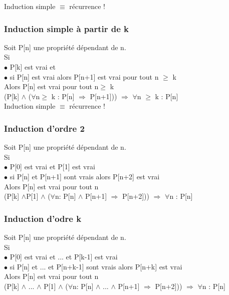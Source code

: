Induction simple $\equiv$ récurrence !
\subsubsection{Induction simple à partir de k}
Soit P[n] une propriété dépendant de n.\\
Si\\ $\bullet$ P[k] est vrai et \\ $\bullet$ si P[n] est vrai alors P[n+1] est vrai pour tout n $\geq$ k \\ Alors P[n] est vrai pour tout n$\geq$ k\\

(P[k] $\wedge$ ($\forall$n$\geq$ k : P[n] $\Rightarrow$ P[n+1])) $\Rightarrow$ $\forall$n $\geq$ k : P[n]\\

Induction simple $\equiv$ récurrence !
\subsubsection{Induction d'ordre 2}
Soit P[n] une propriété dépendant de n.\\
Si\\ $\bullet$ P[0] est vrai et P[1] est vrai \\ $\bullet$ si P[n] et P[n+1] sont vrais alors P[n+2] est vrai\\ Alors P[n] est vrai pour tout n\\

(P[k] $\wedge$P[1] $\wedge$ ($\forall$n: P[n] $\wedge$ P[n+1] $\Rightarrow$ P[n+2])) $\Rightarrow$ $\forall$n  : P[n]\\

\subsubsection{Induction d'odre k}
Soit P[n] une propriété dépendant de n.\\
Si\\ $\bullet$ P[0] est vrai et ... et P[k-1] est vrai \\ $\bullet$ si P[n] et ... et P[n+k-1] sont vrais alors P[n+k] est vrai\\ Alors P[n] est vrai pour tout n\\

(P[k] $\wedge$ ... $\wedge$ P[1] $\wedge$ ($\forall$n: P[n] $\wedge$ ... $\wedge$ P[n+1] $\Rightarrow$ P[n+2])) $\Rightarrow$ $\forall$n  : P[n]\\

